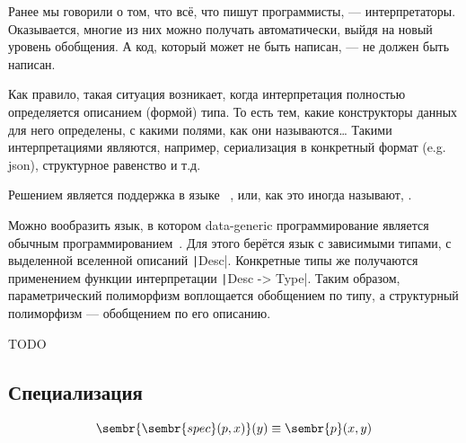 
Ранее мы говорили о том, что всё, что пишут программисты, --- интерпретаторы.
Оказывается, многие из них можно получать автоматически, выйдя на новый уровень обобщения.
А код, который может не быть написан, --- не должен быть написан.

Как правило, такая ситуация возникает, когда интерпретация полностью определяется описанием (формой) типа.
То есть тем, какие конструкторы данных для него определены, с какими полями, как они называются\ldots
Такими интерпретациями являются, например, сериализация в конкретный формат (e.g. json), структурное равенство и т.д.

Решением является поддержка в языке  ~\cite[глава 13]{maguire-types}, или, как это иногда называют, .


Можно вообразить язык, в котором data-generic программирование является обычным программированием~\cite{chapman2010gentle}.
Для этого берётся язык с зависимыми типами, с выделенной вселенной описаний \texttt|Desc|.
Конкретные типы же получаются применением функции интерпретации \texttt|Desc -> Type|.
Таким образом, параметрический полиморфизм воплощается обобщением по типу, а структурный полиморфизм --- обобщением по его описанию.



TODO %

\subsection{Специализация}

\[
    \sembr{\sembr{spec}(p, x)}(y) \equiv \sembr{p}(x, y)
\]








